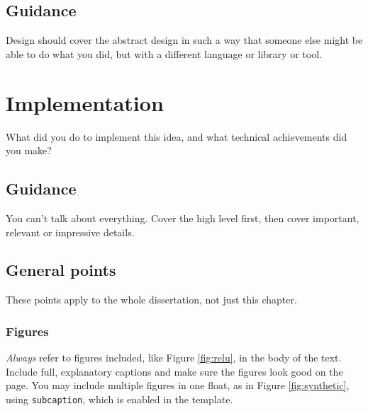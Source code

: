 \documentclass{l4proj}
\begin{document}
\section{Guidance}
Design should cover the abstract design in such a way that someone else might be able to do what you did, but with a different language or library or tool.

\chapter{Implementation}
What did you do to implement this idea, and what technical achievements did you make?
\section{Guidance}
You can't talk about everything. Cover the high level first, then cover important, relevant or impressive details.



\section{General points}

These points apply to the whole dissertation, not just this chapter.



\subsection{Figures}
\emph{Always} refer to figures included, like Figure \ref{fig:relu}, in the body of the text. Include full, explanatory captions and make sure the figures look good on the page.
You may include multiple figures in one float, as in Figure \ref{fig:synthetic}, using \texttt{subcaption}, which is enabled in the template.
\end{document}
